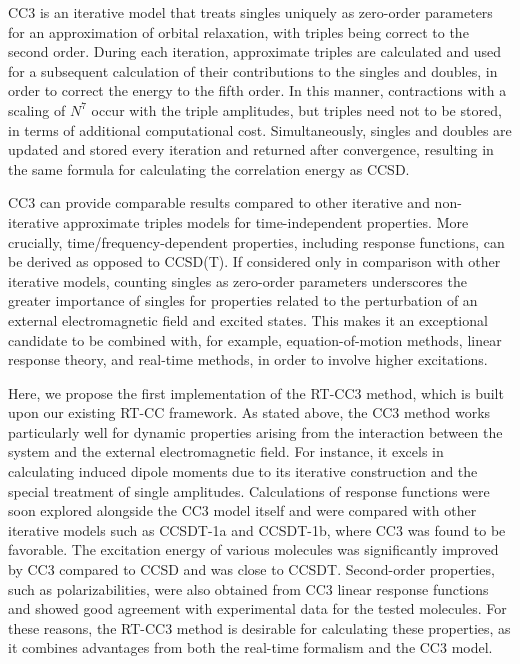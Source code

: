 CC3 is an iterative model that treats singles uniquely as zero-order parameters for an approximation of orbital relaxation, with triples being correct to the second order. During each iteration, approximate triples are calculated and used for a subsequent calculation of their contributions to the singles and doubles, in order to correct the energy to the fifth order. In this manner, contractions with a scaling of $N^{7}$ occur with the triple amplitudes, but triples need not to be stored, in terms of additional computational cost. Simultaneously, singles and doubles are updated and stored every iteration and returned after convergence, resulting in the same formula for calculating the correlation energy as CCSD.

CC3 can provide comparable results compared to other iterative and non-iterative approximate triples models for time-independent properties.\cite{Koch1997} More crucially, time/frequency-dependent properties, including response functions, can be derived as opposed to CCSD(T).\cite{Koch1997, Christiansen1995CC3} If considered only in comparison with other iterative models, counting singles as zero-order parameters underscores the greater importance of singles for properties related to the perturbation of an external electromagnetic field and excited states. This makes it an exceptional candidate to be combined with, for example, equation-of-motion methods,\cite{Stanton1993} linear response theory,\cite{Olsen1985, Sekino1984} and real-time methods,\cite{Goings2018, Li2020} in order to involve higher excitations.

Here, we propose the first implementation of the RT-CC3 method, which is built upon our existing RT-CC framework. As stated above, the CC3 method works particularly well for dynamic properties arising from the interaction between the system and the external electromagnetic field. For instance, it excels in calculating induced dipole moments due to its iterative construction and the special treatment of single amplitudes.\cite{Hald2002} Calculations of response functions were soon explored alongside the CC3 model itself and were compared with other iterative models such as CCSDT-1a and CCSDT-1b, where CC3 was found to be favorable.\cite{Christiansen1995CC3} The excitation energy of various molecules was significantly improved by CC3 compared to CCSD and was close to CCSDT. Second-order properties, such as polarizabilities, were also obtained from CC3 linear response functions and showed good agreement with experimental data for the tested molecules.\cite{Hald2003} For these reasons, the RT-CC3 method is desirable for calculating these properties, as it combines advantages from both the real-time formalism and the CC3 model.

